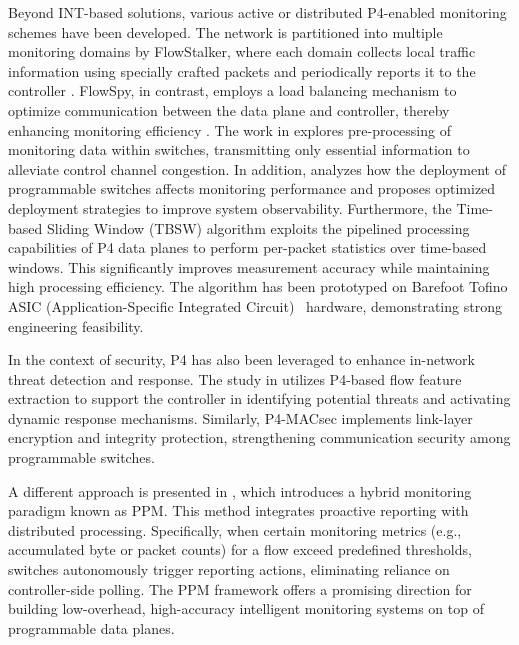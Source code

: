 Beyond INT-based solutions, various active or distributed P4-enabled monitoring schemes have been developed. 
The network is partitioned into multiple monitoring domains by FlowStalker, where each domain collects local traffic information using specially crafted packets and periodically reports it to the controller \cite{8761197}. 
FlowSpy, in contrast, employs a load balancing mechanism to optimize communication between the data plane and controller, thereby enhancing monitoring efficiency \cite{8891487}. 
The work in \cite{9040030} explores pre-processing of monitoring data within switches, transmitting only essential information to alleviate control channel congestion. 
In addition, \cite{8967165} analyzes how the deployment of programmable switches affects monitoring performance and proposes optimized deployment strategies to improve system observability. 
Furthermore, the Time-based Sliding Window (TBSW) algorithm \cite{8855399} exploits the pipelined processing capabilities of P4 data planes to perform per-packet statistics over time-based windows. This significantly improves measurement accuracy while maintaining high processing efficiency. 
The algorithm has been prototyped on Barefoot Tofino ASIC (Application-Specific Integrated Circuit)~\cite{ASIC} hardware, demonstrating strong engineering feasibility. 

In the context of security, P4 has also been leveraged to enhance in-network threat detection and response. 
The study in \cite{9482549} utilizes P4-based flow feature extraction to support the controller in identifying potential threats and activating dynamic response mechanisms. 
Similarly, P4-MACsec \cite{9044731} implements link-layer encryption and integrity protection, strengthening communication security among programmable switches. 

A different approach is presented in \cite{10623873}, which introduces a hybrid monitoring paradigm known as PPM. 
This method integrates proactive reporting with distributed processing. 
Specifically, when certain monitoring metrics (e.g., accumulated byte or packet counts) for a flow exceed predefined thresholds, switches autonomously trigger reporting actions, eliminating reliance on controller-side polling. 
The PPM framework offers a promising direction for building low-overhead, high-accuracy intelligent monitoring systems on top of programmable data planes.

